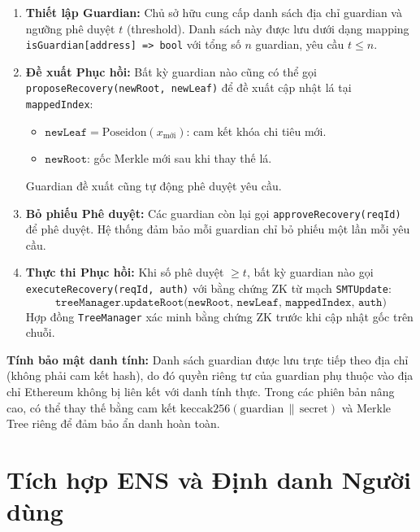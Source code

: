 \documentclass[../DoAn.tex]{subfiles}
\begin{document}
\begin{enumerate}
    \item \textbf{Thiết lập Guardian:} Chủ sở hữu cung cấp danh sách địa chỉ guardian và ngưỡng phê duyệt \(t\) (threshold). Danh sách này được lưu dưới dạng mapping \texttt{isGuardian[address] => bool} với tổng số \(n\) guardian, yêu cầu \(t \leq n\).

    \item \textbf{Đề xuất Phục hồi:} Bất kỳ guardian nào cũng có thể gọi \texttt{proposeRecovery(newRoot, newLeaf)} để đề xuất cập nhật lá tại \texttt{mappedIndex}:
    \begin{itemize}
        \item \(\texttt{newLeaf} = \text{Poseidon}(x_{\text{mới}})\): cam kết khóa chi tiêu mới.
        \item \(\texttt{newRoot}\): gốc Merkle mới sau khi thay thế lá.
    \end{itemize}
    Guardian đề xuất cũng tự động phê duyệt yêu cầu.

    \item \textbf{Bỏ phiếu Phê duyệt:} Các guardian còn lại gọi \texttt{approveRecovery(reqId)} để phê duyệt. Hệ thống đảm bảo mỗi guardian chỉ bỏ phiếu một lần mỗi yêu cầu.

    \item \textbf{Thực thi Phục hồi:} Khi số phê duyệt \(\geq t\), bất kỳ guardian nào gọi \texttt{executeRecovery(reqId, auth)} với bằng chứng ZK từ mạch \texttt{SMTUpdate}:
    \[
        \texttt{treeManager.updateRoot(newRoot, newLeaf, mappedIndex, auth)}
    \]
    Hợp đồng \texttt{TreeManager} xác minh bằng chứng ZK trước khi cập nhật gốc trên chuỗi.
\end{enumerate}

\textbf{Tính bảo mật danh tính:} Danh sách guardian được lưu trực tiếp theo địa chỉ (không phải cam kết hash), do đó quyền riêng tư của guardian phụ thuộc vào địa chỉ Ethereum không bị liên kết với danh tính thực. Trong các phiên bản nâng cao, có thể thay thế bằng cam kết \(\text{keccak256}(\text{guardian} \,\|\, \text{secret})\) và Merkle Tree riêng để đảm bảo ẩn danh hoàn toàn.

\section{Tích hợp ENS và Định danh Người dùng}
\label{subsec:ens}
\end{document}
